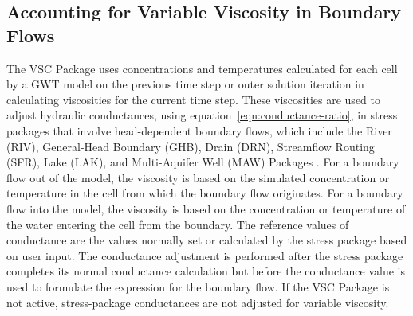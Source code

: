 \subsection{Accounting for Variable Viscosity in Boundary Flows} \label{sec:gwfvsc}

The VSC Package uses concentrations and temperatures calculated for each cell by a GWT model on the previous time step or outer solution iteration in calculating viscosities for the current time step. These viscosities are used to adjust hydraulic conductances, using equation~\ref{eqn:conductance-ratio}, in stress packages that involve head-dependent boundary flows, which include the River (RIV), General-Head Boundary (GHB), Drain (DRN), Streamflow Routing (SFR), Lake (LAK), and Multi-Aquifer Well (MAW) Packages \citep{modflow6gwf}. For a boundary flow out of the model, the viscosity is based on the simulated concentration or temperature in the cell from which the boundary flow originates. For a boundary flow into the model, the viscosity is based on the concentration or temperature of the water entering the cell from the boundary. The reference values of conductance are the values normally set or calculated by the stress package based on user input. The conductance adjustment is performed after the stress package completes its normal conductance calculation but before the conductance value is used to formulate the expression for the boundary flow. If the VSC Package is not active, stress-package conductances are not adjusted for variable viscosity.

